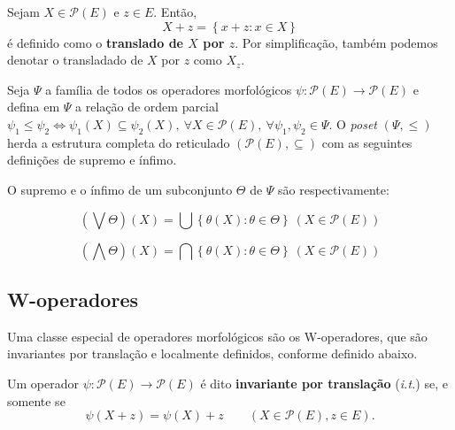 \begin{definition} 
        Sejam $X \in \mathcal{P}\left(E\right)$ e $z \in E$. Então, 
        $$X+z = \left\{x+z:x \in X\right\}$$
        é definido como o \textbf{translado de $X$ por $z$}. Por simplificação, também podemos denotar o transladado de $X$ por $z$ como $X_{z}$.
\end{definition}


Seja $\Psi$ a família de todos os operadores morfológicos $\psi: \mathcal{P}(E) \to \mathcal{P}(E)$ e defina em $\Psi$ a relação de ordem parcial $\psi_{1} \leq \psi_{2} \Longleftrightarrow \psi_{1} \left( X \right) \subseteq \psi_{2} \left( X \right) , \: \forall X \in \mathcal{P}\left( E \right),  \: \forall  \psi_{1},\psi_{2} \in \Psi $. O \textit{poset} $ \left( \Psi,\leq \right) $ herda a estrutura completa do reticulado $ \left( \mathcal{P}\left(E\right), \subseteq \right)$ com as seguintes definições de supremo e ínfimo.

\begin{definition} 
        O supremo e o ínfimo de um subconjunto $\Theta$ de $\Psi$ são respectivamente:
        
        $$ \left( \bigvee \Theta \right) \left( X \right) = \bigcup \left\{ \theta \left( X \right): \theta \in \Theta \right\} \ \left( X \in \mathcal{P} \left( E \right) \right) $$

        $$ \left( \bigwedge \Theta \right) \left( X \right) = \bigcap \left\{ \theta \left( X \right): \theta \in \Theta \right\} \ \left( X \in \mathcal{P} \left( E \right) \right) $$
\end{definition}



\subsection{W-operadores}
\label{subsec:wop}

Uma classe especial de operadores morfológicos são os W-operadores, que são invariantes por translação e localmente definidos, conforme definido abaixo.

\begin{definition} 
        Um operador $\psi: \mathcal{P}\left(E\right) \rightarrow \mathcal{P}\left(E\right)$ é dito \textbf{invariante por translação} (\textit{i.t.}) se, e somente se
        $$\psi\left(X+z\right) = \psi\left(X\right) + z \qquad \left(X \in \mathcal{P}\left(E\right), z \in E\right).$$
        \label{def:it}
\end{definition}

